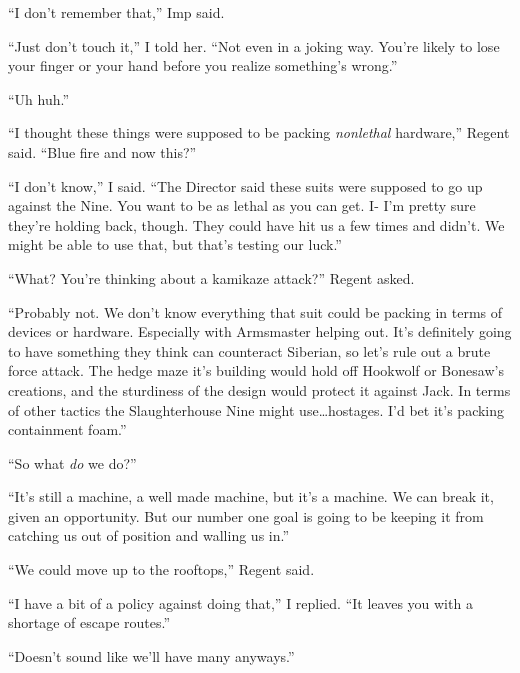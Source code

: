 ``I don't remember that,'' Imp said.



``Just don't touch it,'' I told her.  ``Not even in a joking way.  You're likely to lose your finger or your hand before you realize something's wrong.''



``Uh huh.''



``I thought these things were supposed to be packing \emph{nonlethal }hardware,'' Regent said.  ``Blue fire and now this?''



``I don't know,'' I said.  ``The Director said these suits were supposed to go up against the Nine.  You want to be as lethal as you can get.  I- I'm pretty sure they're holding back, though.  They could have hit us a few times and didn't.  We might be able to use that, but that's testing our luck.''



``What?  You're thinking about a kamikaze attack?''  Regent asked.



``Probably not.  We don't know everything that suit could be packing in terms of devices or hardware.  Especially with Armsmaster helping out.  It's definitely going to have something they think can counteract Siberian, so let's rule out a brute force attack.  The hedge maze it's building would hold off Hookwolf or Bonesaw's creations, and the sturdiness of the design would protect it against Jack.  In terms of other tactics the Slaughterhouse Nine might use\ldots hostages.  I'd bet it's packing containment foam.''



``So what \emph{do} we do?''



``It's still a machine, a well made machine, but it's a machine.  We can break it, given an opportunity.  But our number one goal is going to be keeping it from catching us out of position and walling us in.''



``We could move up to the rooftops,'' Regent said.



``I have a bit of a policy against doing that,'' I replied.  ``It leaves you with a shortage of escape routes.''



``Doesn't sound like we'll have many anyways.''



